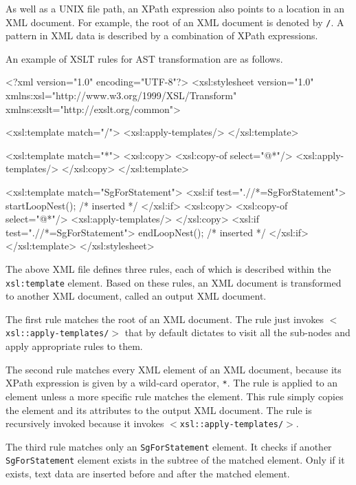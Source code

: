 As well as a UNIX file path, an XPath expression also points to a
location in an XML document.  For example, the root of an XML document
is denoted by \texttt{/}.  A pattern in XML data is described by a
combination of XPath expressions.


An example of XSLT rules for AST transformation are as follows.
\begin{framed}
\begin{src}
<?xml version="1.0" encoding="UTF-8"?>
<xsl:stylesheet version="1.0"
   xmlns:xsl="http://www.w3.org/1999/XSL/Transform"
   xmlns:exslt="http://exslt.org/common">

  <xsl:template match="/">
    <xsl:apply-templates/>
  </xsl:template>

  <xsl:template match="*">
    <xsl:copy>
      <xsl:copy-of select="@*"/>
      <xsl:apply-templates/>
    </xsl:copy>
  </xsl:template>

  <xsl:template match="SgForStatement">
    <xsl:if test=".//*=SgForStatement">
    startLoopNest(); /* inserted */
    </xsl:if>
    <xsl:copy>
      <xsl:copy-of select="@*"/>
      <xsl:apply-templates/>
    </xsl:copy>
    <xsl:if test=".//*=SgForStatement">
    endLoopNest(); /* inserted */
    </xsl:if>
  </xsl:template>
</xsl:stylesheet>
\end{src}
\end{framed}
The above XML file defines three rules, each of which is described
within the \texttt{xsl:template} element. Based on these rules, an XML
document is transformed to another XML document, called an output XML
document.

The first rule matches the root of an XML document. The rule just
invokes \texttt{$<$xsl::apply-templates/$>$} that by default dictates to
visit all the sub-nodes and apply appropriate rules to them.

The second rule matches every XML element of an XML document, because
its XPath expression is given by a wild-card operator, \texttt{*}. The
rule is applied to an element unless a more specific rule matches the
element.  This rule simply copies the element and its attributes to the
output XML document.  The rule is recursively invoked because it invokes
\texttt{$<$xsl::apply-templates/$>$}.

The third rule matches only an \texttt{SgForStatement} element. It
checks if another \texttt{SgForStatement} element exists in the subtree
of the matched element.  Only if it exists, text data are inserted
before and after the matched element.

